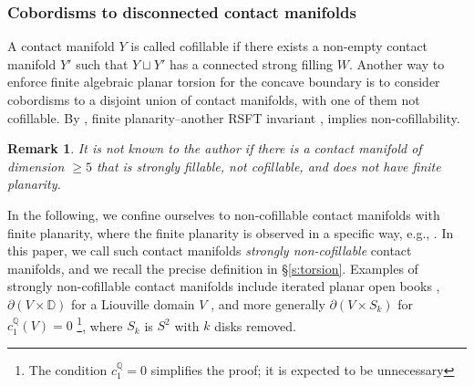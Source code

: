 \documentclass[11pt]{amsart}
\numberwithin{equation}{section}
\newtheorem{remark}[theorem]{\textbf{Remark}}
\def\D{{\mathbb D}}
\def\Q{{\mathbb Q}}
\begin{document}
\subsubsection{Cobordisms to disconnected contact manifolds}
A contact manifold $Y$ is called cofillable if there exists a non-empty contact manifold $Y'$ such that $Y\sqcup Y'$ has a connected strong filling $W$. Another way to enforce finite algebraic planar torsion for the concave boundary is to consider cobordisms to a disjoint union of contact manifolds, with one of them not cofillable. By \cite[Theorem 1.2]{moreno2024rsft}, finite planarity--another RSFT invariant \cite[Definition 3.24]{moreno2024landscape},  implies non-cofillability.
\begin{remark}
    It is not known to the author if there is a contact manifold of dimension $\ge 5$ that is strongly fillable, not cofillable, and does not have finite planarity.
\end{remark}
In the following, we confine ourselves to non-cofillable contact manifolds with finite planarity, where the finite planarity is observed in a specific way, e.g., \cite[Proposition 4.5]{moreno2024rsft}. In this paper, we call such contact manifolds \emph{strongly non-cofillable} contact manifolds, and we recall the precise definition in \S \ref{s:torsion}. Examples of strongly non-cofillable contact manifolds include iterated planar open books \cite[Theorem B(5)]{moreno2024landscape}, $\partial(V\times \D)$ for a Liouville domain $V$ \cite{zbMATH07673358}, and more generally $\partial(V\times S_k)$ for $c^{\Q}_1(V)=0$ \cite[Theorem 6.6]{moreno2024landscape}\footnote{The condition $c_1^{\Q}=0$ simplifies the proof; it is expected to be unnecessary}, where $S_k$ is $S^2$ with $k$ disks removed.
\end{document}
